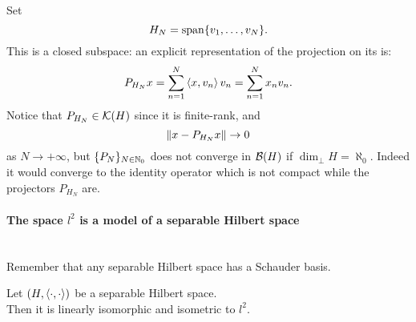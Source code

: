 Set
$$
	H_N
	= \operatorname{span}\{v_1,\ldots, v_N \}
.$$
This is a closed subspace: an explicit representation of the projection on its is:
$$
P_{H_N} x 
= \sum_{n=1}^N \left\langle x, v_n\right\rangle v_n
= \sum_{n=1}^N x_n v_n
.
$$
Notice that $P_{H_N} \in \mathcal K(H)$ since it is finite-rank, and 
$$
\left\lVert x-P_{H_N} x\right\rVert
\to 0
$$
as $N \to +\infty$, but $\{P_N\}_{N \in \mathbb N_0}$ does not converge in $\mathcal B(H)$ if $\dim_\perp H = \aleph_0$.
Indeed it would converge to the identity operator which is not compact while the projectors $P_{H_N}$ are.


\paragraph{The space $l^2$ is a model of a separable Hilbert space} \\
Remember that any separable Hilbert space has a Schauder basis.

\begin{prop}
	Let $(H, \left\langle\cdot , \cdot\right\rangle)$ be a separable Hilbert space. \\
	Then it is linearly isomorphic and isometric to $l^2$.
\end{prop}

